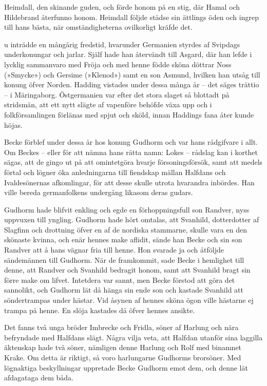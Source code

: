 Heimdall, den skinande guden, och förde honom på en stig, där Hamal och
Hildebrand återfunno honom. Heimdall följde städse sin ättlings öden och
ingrep till hans bästa, när omständigheterna ovilkorligt kräfde det.

\endSecII


\dropcapN u inträdde en mångårig fredstid, hvarunder Germanien styrdes af
Svipdags underkonungar och jarlar. Själf hade han återvändt till Asgard,
där han lefde i lycklig sammanvaro med Fröja och med henne födde sköna
döttrar Noss (»Smycke») och Gersime (»Klenod») samt en son Asmund,
hvilken han utsåg till konung öfver Norden. Hadding vistades under dessa
många år -- det säges trättio -- i Märingaborg. Östgermanien var efter
det stora slaget så blottadt på stridsmän, att ett nytt slägte af
vapenföre behöfde växa upp och i folkförsamlingen förlänas med spjut och
sköld, innan Haddings fana åter kunde höjas.

Becke förblef under dessa år hos konung Gudhorm och var hans rådgifvare
i allt. Om Beckes -- eller för att nämna hans rätta namn: Lokes --
rådslag kan i korthet sägas, att de gingo ut på att omintetgöra hvarje
försoningsförsök, samt att medels förtal och lögner öka anledningarna
till fiendskap mällan Halfdans och Ivaldesönernas afkomlingar, för att
desse skulle utrota hvarandra inbördes. Han ville bereda germanfolkens
undergång likasom deras gudars.

Gudhorm hade blifvit enkling och egde en förhoppningsfull son Randver,
nyss uppvuxen till yngling. Gudhorm hade hört omtalas, att Svanhild,
dotterdotter af Slagfinn och drottning öfver en af de nordiska
stammarne, skulle vara en den skönaste kvinna, och enär hennes make
aflidit, sände han Becke och sin son Randver att å hans vägnar fria till
henne. Hon svarade ja och åtföljde sändemännen till Gudhorm. När de
framkommit, sade Becke i hemlighet till denne, att
Randver
och Svanhild bedragit honom, samt att Svanhild bragt sin förre make om
lifvet. Intetdera var sannt, men Becke förstod att göra det sannolikt,
och Gudhorm lät då hänga sin ende son och kastade Svanhild att
söndertrampas under hästar. Vid åsynen af hennes sköna ögon ville
hästarne ej trampa på henne. En slöja kastades då öfver hennes ansikte.

Det fanns två unga bröder Imbrecke och Fridla, söner af Harlung och nära
befryndade med Halfdans slägt. Några vilja veta, att Halfdan utanför
sina laggilla äktenskap hade två söner, nämligen denne Harlung och Rolf
med binamnet Krake. Om detta är riktigt, så voro harlungarne Gudhorms
brorsöner. Med lögnaktiga beskyllningar uppretade Becke Gudhorm emot
dem, och denne lät afdagataga dem båda.

